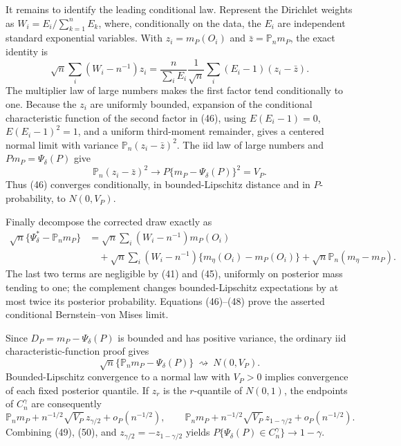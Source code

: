It remains to identify the leading conditional law.  Represent the Dirichlet weights as
\(W_i=E_i/\sum_{k=1}^nE_k\), where, conditionally on the data, the \(E_i\) are independent standard exponential variables.  With
\(z_i=m_P(O_i)\) and \(\bar z=\mathbb P_nm_P\), the exact identity is
\begin{equation}
 \sqrt n\sum_i(W_i-n^{-1})z_i
 =\frac{n}{\sum_iE_i}\frac1{\sqrt n}\sum_i(E_i-1)(z_i-\bar z).                         \tag{46}
\end{equation}
The multiplier law of large numbers makes the first factor tend conditionally to one.  Because the \(z_i\) are uniformly bounded, expansion of the conditional characteristic function of the second factor in (46), using
\(E(E_i-1)=0\), \(E(E_i-1)^2=1\), and a uniform third-moment remainder, gives a centered normal limit with variance
\(\mathbb P_n(z_i-\bar z)^2\).  The iid law of large numbers and
\(Pm_P=\Psi_\delta(P)\) give
\begin{equation}
 \mathbb P_n(z_i-\bar z)^2\longrightarrow
 P\{m_P-\Psi_\delta(P)\}^2=V_P.                                                        \tag{47}
\end{equation}
Thus (46) converges conditionally, in bounded-Lipschitz distance and in \(P\)-probability, to \(N(0,V_P)\).

Finally decompose the corrected draw exactly as
\begin{equation}
\begin{aligned}
 \sqrt n\{\Psi_\delta^*-\mathbb P_nm_P\}
 &=\sqrt n\sum_i(W_i-n^{-1})m_P(O_i)\\
 &\quad+\sqrt n\sum_i(W_i-n^{-1})\{m_\eta(O_i)-m_P(O_i)\}
       +\sqrt n\mathbb P_n(m_\eta-m_P).
\end{aligned}                                                                             \tag{48}
\end{equation}
The last two terms are negligible by (41) and (45), uniformly on posterior mass tending to one; the complement changes bounded-Lipschitz expectations by at most twice its posterior probability.  Equations (46)--(48) prove the asserted conditional Bernstein--von Mises limit.

Since \(D_P=m_P-\Psi_\delta(P)\) is bounded and has positive variance, the ordinary iid characteristic-function proof gives
\begin{equation}
 \sqrt n\{\mathbb P_nm_P-\Psi_\delta(P)\}\ \rightsquigarrow\ N(0,V_P).                \tag{49}
\end{equation}
Bounded-Lipschitz convergence to a normal law with \(V_P>0\) implies convergence of each fixed posterior quantile.  If \(z_r\) is the \(r\)-quantile of \(N(0,1)\), the endpoints of \(C_n^\gamma\) are consequently
\begin{equation}
 \mathbb P_nm_P+n^{-1/2}\sqrt{V_P}\,z_{\gamma/2}+o_P(n^{-1/2}),\qquad
 \mathbb P_nm_P+n^{-1/2}\sqrt{V_P}\,z_{1-\gamma/2}+o_P(n^{-1/2}).                      \tag{50}
\end{equation}
Combining (49), (50), and \(z_{\gamma/2}=-z_{1-\gamma/2}\) yields
\(P\{\Psi_\delta(P)\in C_n^\gamma\}\to1-\gamma\).

